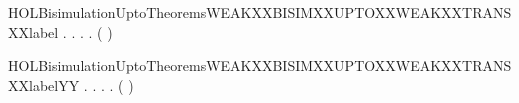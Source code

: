 \begin{SaveVerbatim}{HOLBisimulationUptoTheoremsWEAKXXBISIMXXUPTOXXWEAKXXTRANSXXlabel}
\HOLTokenTurnstile{} \HOLSymConst{\HOLTokenForall{}}.
         \HOLSymConst{\HOLTokenImp{}}
       \HOLSymConst{\HOLTokenForall{}} .
              \HOLSymConst{\HOLTokenImp{}}
           \HOLSymConst{\HOLTokenForall{}} .
                \HOLTokenWeakTransBegin{} \HOLTokenWeakTransEnd {} \HOLSymConst{\HOLTokenImp{}}
               \HOLSymConst{\HOLTokenExists{}}.
                    \HOLTokenWeakTransBegin{} \HOLTokenWeakTransEnd {} \HOLSymConst{\HOLTokenConj{}}
                   (    )  
\end{SaveVerbatim}
\newcommand{\HOLBisimulationUptoTheoremsWEAKXXBISIMXXUPTOXXWEAKXXTRANSXXlabel}{\UseVerbatim{HOLBisimulationUptoTheoremsWEAKXXBISIMXXUPTOXXWEAKXXTRANSXXlabel}}
\begin{SaveVerbatim}{HOLBisimulationUptoTheoremsWEAKXXBISIMXXUPTOXXWEAKXXTRANSXXlabelYY}
\HOLTokenTurnstile{} \HOLSymConst{\HOLTokenForall{}}.
         \HOLSymConst{\HOLTokenImp{}}
       \HOLSymConst{\HOLTokenForall{}} .
              \HOLSymConst{\HOLTokenImp{}}
           \HOLSymConst{\HOLTokenForall{}} .
                \HOLTokenWeakTransBegin{} \HOLTokenWeakTransEnd {} \HOLSymConst{\HOLTokenImp{}}
               \HOLSymConst{\HOLTokenExists{}}.
                    \HOLTokenWeakTransBegin{} \HOLTokenWeakTransEnd {} \HOLSymConst{\HOLTokenConj{}}
                   (    )  
\end{SaveVerbatim}
\newcommand{\HOLBisimulationUptoTheoremsWEAKXXBISIMXXUPTOXXWEAKXXTRANSXXlabelYY}{\UseVerbatim{HOLBisimulationUptoTheoremsWEAKXXBISIMXXUPTOXXWEAKXXTRANSXXlabelYY}}
